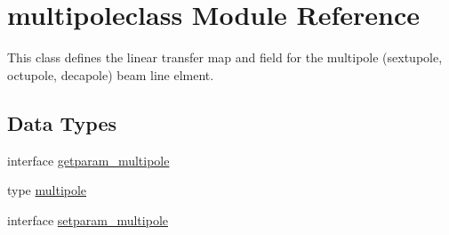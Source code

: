 \hypertarget{namespacemultipoleclass}{}\section{multipoleclass Module Reference}
\label{namespacemultipoleclass}


This class defines the linear transfer map and field for the multipole (sextupole, octupole, decapole) beam line elment.  


\subsection*{Data Types}
\begin{DoxyCompactItemize}
\item 
interface \mbox{\hyperlink{interfacemultipoleclass_1_1getparam__multipole}{getparam\+\_\+multipole}}
\item 
type \mbox{\hyperlink{namespacemultipoleclass_structmultipoleclass_1_1multipole}{multipole}}
\item 
interface \mbox{\hyperlink{interfacemultipoleclass_1_1setparam__multipole}{setparam\+\_\+multipole}}
\end{DoxyCompactItemize}
